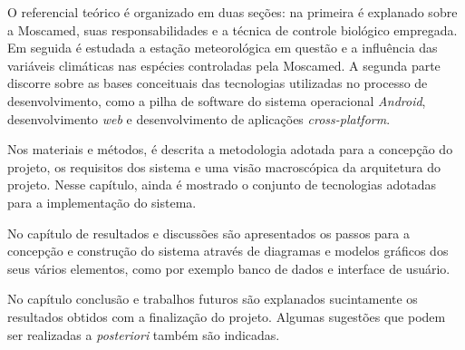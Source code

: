 O referencial teórico é organizado em duas seções: na primeira é explanado sobre a Moscamed, suas responsabilidades e a técnica de controle biológico empregada. Em seguida é estudada a estação meteorológica em questão e a influência das variáveis climáticas nas espécies controladas pela Moscamed. A segunda parte discorre sobre as bases conceituais das tecnologias utilizadas no processo de desenvolvimento, como a pilha de software do sistema operacional \textit{Android}, desenvolvimento \textit{web} e desenvolvimento de aplicações \textit{cross-platform}.

Nos materiais e métodos, é descrita a metodologia adotada para a concepção do projeto, os requisitos dos sistema e uma visão macroscópica da arquitetura do projeto. Nesse capítulo, ainda é mostrado o conjunto de tecnologias adotadas para a implementação do sistema.    

No capítulo de resultados e discussões são apresentados os passos para a concepção e construção do sistema através de diagramas e modelos gráficos dos seus vários elementos, como por exemplo banco de dados e interface de usuário.

No capítulo conclusão e trabalhos futuros são explanados sucintamente os resultados obtidos com a finalização do projeto. Algumas sugestões que podem ser realizadas a \textit{posteriori} também são indicadas.
